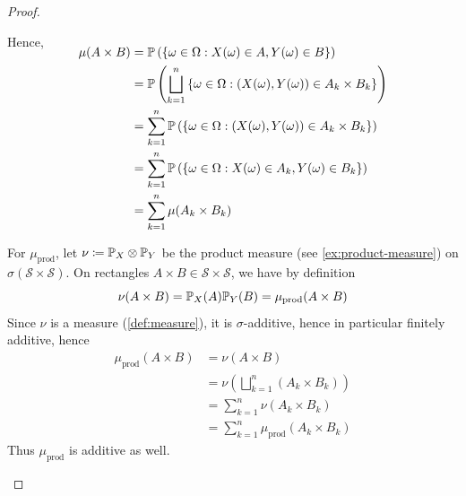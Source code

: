 \begin{proof}
\begin{itemize}
\endgroup
Hence,
\begingroup
\allowdisplaybreaks
\begin{align*}
\SwapAboveDisplaySkip
\mu(A \times B)
&=
\Prob\left(\{\omega \in \Omega : X(\omega) \in A, Y(\omega) \in B\}\right) \\
&=
\Prob\left(\bigsqcup_{k = 1}^n \left\{\omega \in \Omega : (X(\omega), Y(\omega)) \in A_k \times B_k\right\}\right) \\
&=
\sum_{k = 1}^n \Prob\left(\left\{\omega \in \Omega : (X(\omega), Y(\omega)) \in A_k \times B_k\right\}\right) \\
&=
\sum_{k = 1}^n \Prob\left(\left\{\omega \in \Omega : X(\omega)\in A_k, Y(\omega) \in B_k\right\}\right) \\
&=
\sum_{k = 1}^n \mu(A_k \times B_k) 
\end{align*}
\endgroup


For $\mu_{\text{prod}}$, let
\(
\nu \coloneq \mathbb{P}_X \otimes \mathbb{P}_Y
\)
be the product measure (see \autoref{ex:product-measure}) on $\sigma(\mathcal{S} \times \mathcal{S})$.
On rec\-tan\-gles $A \times B \allowbreak \in \allowbreak \mathcal{S} \times \mathcal{S}$, we have by definition
\[
\nu(A \times B)
=
\mathbb{P}_X(A)\mathbb{P}_Y(B)
=
\mu_{\text{prod}}(A \times B)
\]
Since $\nu$ is a measure (\autoref{def:measure}), it is $\sigma$-additive, hence in particular finitely additive, hence %
\[
\begin{aligned}
\mu_{\text{prod}}(A \times B)
&=
\nu(A \times B) \\
&=
\nu\left(\bigsqcup_{k=1}^n (A_k \times B_k)\right) \\
&=
\sum_{k=1}^n \nu(A_k \times B_k) \\
&=
\sum_{k=1}^n \mu_{\text{prod}}(A_k \times B_k)
\end{aligned}
\]
Thus $\mu_{\text{prod}}$ is additive as well. \cmark


\end{itemize}
\end{proof}
